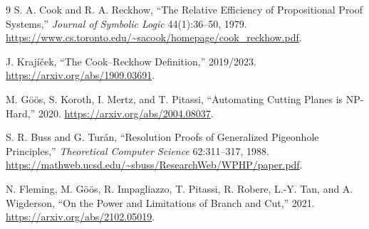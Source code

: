 \documentclass[11pt]{article}
\begin{document}
\begin{thebibliography}{9}
S. A. Cook and R. A. Reckhow,
``The Relative Efficiency of Propositional Proof Systems,''
\emph{Journal of Symbolic Logic} 44(1):36--50, 1979.
\url{https://www.cs.toronto.edu/~sacook/homepage/cook_reckhow.pdf}.

J. Kraj\'i\v{c}ek,
``The Cook--Reckhow Definition,'' 2019/2023.
\url{https://arxiv.org/abs/1909.03691}.

M. G\"o\"os, S. Koroth, I. Mertz, and T. Pitassi,
``Automating Cutting Planes is NP-Hard,'' 2020.
\url{https://arxiv.org/abs/2004.08037}.

S. R. Buss and G. Tur\'an,
``Resolution Proofs of Generalized Pigeonhole Principles,''
\emph{Theoretical Computer Science} 62:311--317, 1988.
\url{https://mathweb.ucsd.edu/~sbuss/ResearchWeb/WPHP/paper.pdf}.

N. Fleming, M. G\"o\"os, R. Impagliazzo, T. Pitassi, R. Robere,
L.-Y. Tan, and A. Wigderson,
``On the Power and Limitations of Branch and Cut,'' 2021.
\url{https://arxiv.org/abs/2102.05019}.
\end{thebibliography}
\end{document}
